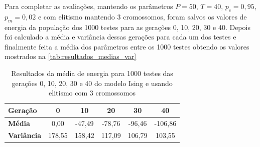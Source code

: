 Para completar as avaliações, mantendo os parâmetros \(P = 50\), \(T = 40\), \(p_c = 0,95\), \(p_m = 0,02\) e com elitismo mantendo 3 cromossomos, foram salvos os valores de energia da população dos 1000 testes para as gerações 0, 10, 20, 30 e 40. Depois foi calculado a média e variância dessas gerações para cada um dos testes e finalmente feita a média dos parâmetros entre os 1000 testes obtendo os valores mostrados na \autoref{tab:resultados_medias_var}

\begin{table}[h!]
	\centering
	\begin{tabular}{|l|c|c|c|c|c|}
		\hline
		\textbf{Geração}   & \textbf{0} & \textbf{10} & \textbf{20} & \textbf{30} & \textbf{40} \\ \hline
		\textbf{Média}     & 0,00       & -47,49      & -78,76      & -96,46      & -106,86      \\ \hline
		\textbf{Variância} & 178,55     & 158,42      & 117,09       & 106,79       & 103,55       \\ \hline
	\end{tabular}
	\caption{Resultados da média de energia para 1000 testes das gerações 0, 10, 20, 30 e 40 do modelo Ising e usando elitismo com 3 cromossomos}
	\label{tab:resultados_medias_var}
\end{table}

